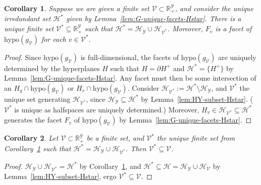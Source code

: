 \documentclass[11pt]{article}
\newcommand{\Comments}{1}
\newcommand{\mynote}[2]{\ifnum\Comments=1\textcolor{#1}{#2}\fi}
\newcommand{\raf}[1]{\mynote{darkgreen}{[RF: #1]}}
\newcommand{\reals}{\mathbb{R}}
\renewcommand{\H}{\mathcal{H}}
\newcommand{\V}{\mathcal{V}}
\newcommand{\Y}{\mathcal{Y}}
\newcommand{\hyp}{\mathrm{hypo}}
\newtheorem{corollary}{Corollary}
\begin{document}
\begin{corollary}\label{cor:unique-set-loss-vectors-defining-facets}
  Suppose we are given a finite set $\V \subset \reals^\Y_+$, and consider the unique irredundant set $\H^*$ given by Lemma~\ref{lem:G-unique-facets-Hstar}. %
  There is a unique finite set $\V^* \subseteq \reals^\Y_+$ such that $\H^* = \H_\Y \cup \H_{\V^*}$.
  Moreover, $F_v$ is a facet of $\hyp(g_\V)$ for each $v\in\V^*$.
\end{corollary}
\begin{proof}
%
  Since $\hyp(g_\V)$ is full-dimensional, the facets of $\hyp(g_\V)$ are uniquely determined by the hyperplanes $H$ such that $H = \partial H^+$ and $\H^* = \{H^+\}$ by Lemma~\ref{lem:G-unique-facets-Hstar}.
  Any facet must then be some intersection of an $H_y \cap \hyp(g_\V)$ or $H_v \cap \hyp(g_\V)$.
  Consider $\H_{\V^*} := \H^* \setminus \H_{\Y}$, and $\V^*$ the unique set generating $\H_{\V^*}$, since $\H_\Y \subseteq \H^*$ by Lemma~\ref{lem:HY-subset-Hstar}.
  ($\V^*$ is unique as halfspaces are uniquely determined.)
  Moreover, $H_v \in \H_{\V^*} \subseteq \H^*$ generates the facet $F_v$ of $\hyp(g_\V)$ by Lemma~\ref{lem:G-unique-facets-Hstar}.
%
\end{proof}



\begin{corollary}\label{cor:anything-gen-G-subset-Hstar}
  Let $\V \subset \reals^\Y_+$ be a finite set, and $\V^*$ the unique finite set from Corollary~\ref{cor:unique-set-loss-vectors-defining-facets} such that $\H^* = \H_\Y \cup \H_{\V^*}$. %
  Then $\V^* \subseteq \V$.
\end{corollary}
\begin{proof}
  $\H_\Y \cup \H_{\V^*} = \H^*$ by Corollary~\ref{cor:unique-set-loss-vectors-defining-facets}, and $\H^* \subseteq \H = \H_\Y \cup \H_{\V}$ by Lemma~\ref{lem:HY-subset-Hstar}, ergo $\V^* \subseteq \V$.
\end{proof}
\end{document}
